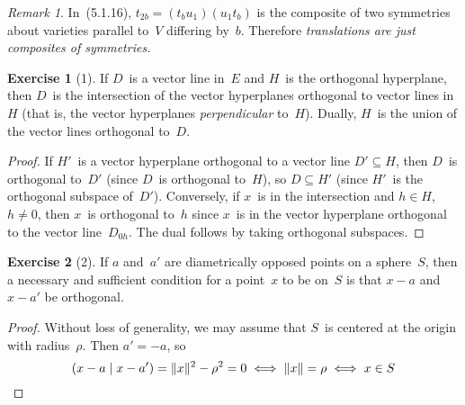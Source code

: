 \documentclass[letterpaper,12pt]{article}
\newcommand{\norm}[1]{\lVert{#1}\rVert}
\newcommand{\innerprod}[2]{({#1}\;|\;{#2})}
\theoremstyle{definition}
\newtheorem*{exer}{Exercise}
\theoremstyle{remark}
\newtheorem*{rmk}{Remark}
\begin{document}
\begin{rmk}
In~(5.1.16), \(t_{2b}=(t_bu_1)(u_1t_b)\) is the composite of two symmetries about varieties parallel to~\(V\) differing by~\(b\). Therefore \emph{translations are just composites of symmetries.}
\end{rmk}

\begin{exer}[1]
If \(D\)~is a vector line in~\(E\) and \(H\)~is the orthogonal hyperplane, then \(D\)~is the intersection of the vector hyperplanes orthogonal to vector lines in~\(H\) (that is, the vector hyperplanes \emph{perpendicular} to~\(H\)). Dually, \(H\)~is the union of the vector lines orthogonal to~\(D\).
\end{exer}
\begin{proof}
If \(H'\)~is a vector hyperplane orthogonal to a vector line \(D'\subseteq H\), then \(D\)~is orthogonal to~\(D'\) (since \(D\)~is orthogonal to~\(H\)), so \(D\subseteq H'\) (since \(H'\)~is the orthogonal subspace of~\(D'\)). Conversely, if \(x\)~is in the intersection and \(h\in H\), \(h\ne 0\), then \(x\)~is orthogonal to~\(h\) since \(x\)~is in the vector hyperplane orthogonal to the vector line~\(D_{0h}\). The dual follows by taking orthogonal subspaces.
\end{proof}

\begin{exer}[2]
If \(a\) and~\(a'\) are diametrically opposed points on a sphere~\(S\), then a necessary and sufficient condition for a point~\(x\) to be on~\(S\) is that \(x-a\) and \(x-a'\) be orthogonal.
\end{exer}
\begin{proof}
Without loss of generality, we may assume that \(S\)~is centered at the origin with radius~\(\rho\). Then \(a'=-a\), so
\[\innerprod{x-a}{x-a'}=\norm{x}^2-\rho^2=0\iff\norm{x}=\rho\iff x\in S\qedhere\]
\end{proof}
\end{document}
